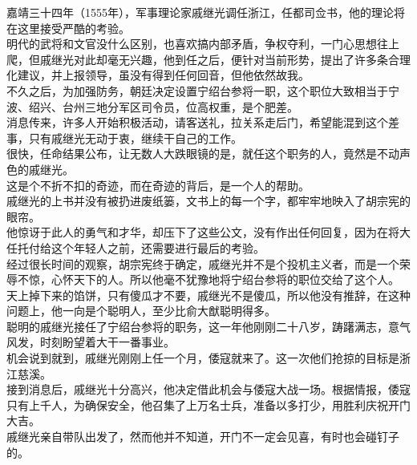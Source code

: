 \begin{multicols}{\theparacolNo}
嘉靖三十四年（1555年），军事理论家戚继光调任浙江，任都司佥书，他的理论将在这里接受严酷的考验。\\

明代的武将和文官没什么区别，也喜欢搞内部矛盾，争权夺利，一门心思想往上爬，但戚继光对此却毫无兴趣，他到任之后，便针对当前形势，提出了许多条合理化建议，并上报领导，虽没有得到任何回音，但他依然故我。\\

不久之后，为加强防务，朝廷决定设置宁绍台参将一职，这个职位大致相当于宁波、绍兴、台州三地分军区司令员，位高权重，是个肥差。\\

消息传来，许多人开始积极活动，请客送礼，拉关系走后门，希望能混到这个差事，只有戚继光无动于衷，继续干自己的工作。\\

很快，任命结果公布，让无数人大跌眼镜的是，就任这个职务的人，竟然是不动声色的戚继光。\\

这是个不折不扣的奇迹，而在奇迹的背后，是一个人的帮助。\\

戚继光的上书并没有被扔进废纸篓，文书上的每一个字，都牢牢地映入了胡宗宪的眼帘。\\

他惊讶于此人的勇气和才华，却压下了这些公文，没有作出任何回复，因为在将大任托付给这个年轻人之前，还需要进行最后的考验。\\

经过很长时间的观察，胡宗宪终于确定，戚继光并不是个投机主义者，而是一个荣辱不惊，心怀天下的人。所以他毫不犹豫地将宁绍台参将的职位交给了这个人。\\

天上掉下来的馅饼，只有傻瓜才不要，戚继光不是傻瓜，所以他没有推辞，在这种问题上，他一向是个聪明人，至少比俞大猷聪明得多。\\

聪明的戚继光接任了宁绍台参将的职务，这一年他刚刚二十八岁，踌躇满志，意气风发，时刻盼望着大干一番事业。\\

机会说到就到，戚继光刚刚上任一个月，倭寇就来了。这一次他们抢掠的目标是浙江慈溪。\\

接到消息后，戚继光十分高兴，他决定借此机会与倭寇大战一场。根据情报，倭寇只有上千人，为确保安全，他召集了上万名士兵，准备以多打少，用胜利庆祝开门大吉。\\

戚继光亲自带队出发了，然而他并不知道，开门不一定会见喜，有时也会碰钉子的。\\


\end{multicols}
